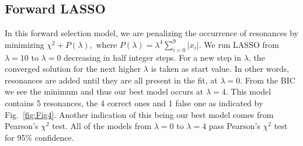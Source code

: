 \documentclass[aps, prd, twocolumn, showpacs, superscriptaddress,
preprintnumbers, nofootinbib]{revtex4-1}
\begin{document}
\subsection{Forward LASSO}

In this forward selection model, we are penalizing the occurrence of resonances by minimizing  $\chi^2+P(\lambda), \text{ where } P(\lambda) =   \lambda^4 \sum_{i=0}^{9}  |x_i|$. We run LASSO from $\lambda = 10 \text{ to } \lambda = 0$ decreasing in half integer steps. For a new step in $\lambda$, the converged solution for the next higher $\lambda$ is taken as start value. In other words, resonances are added until they are all present in the fit, at $\lambda=0$. From the BIC we see the minimum and thus our best model occurs at $\lambda=4$. This model contains 5 resonances, the 4 correct ones and 1 false one as indicated by Fig.~\ref{fig:Fig4}. Another indication of this being our best model comes from Pearson's $\chi^2$ test. All of the models from $\lambda=0$ to $\lambda=4$ pass Pearson's $\chi^2$ test for 95\% confidence.
\end{document}
